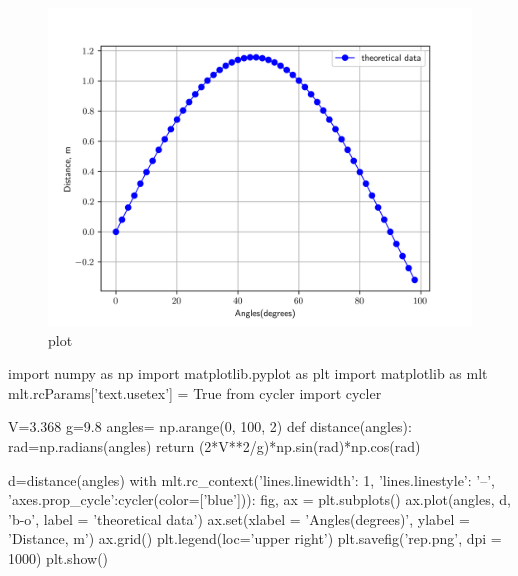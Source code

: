 \documentclass[11pt]{article}
\begin{document}
\begin{figure}[H]
    \centering
    \includegraphics[width=1\linewidth]{rep.png}
    \caption{plot}
    \label{fig:erep}
\end{figure}

\begin{python}


import numpy as np
import matplotlib.pyplot as plt
import matplotlib as mlt
mlt.rcParams['text.usetex'] = True
from cycler import cycler

V=3.368
g=9.8
angles= np.arange(0, 100, 2)
def distance(angles):
    rad=np.radians(angles)
    return (2*V**2/g)*np.sin(rad)*np.cos(rad)

d=distance(angles)
with mlt.rc_context({'lines.linewidth': 1, 'lines.linestyle': '--', 'axes.prop_cycle':cycler(color=['blue'])}):
    fig, ax = plt.subplots()
    ax.plot(angles, d, 'b-o', label = 'theoretical data')
    ax.set(xlabel = 'Angles(degrees)', ylabel = 'Distance, m')
    ax.grid()
    plt.legend(loc='upper right')
    plt.savefig('rep.png', dpi = 1000)
    plt.show()
\end{python}

\nocite{luo2005quantitative}



\end{document}
